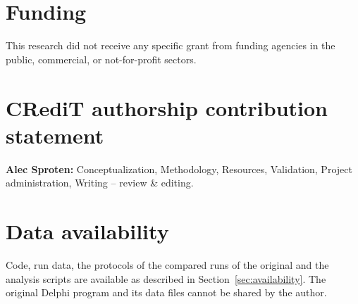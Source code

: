 \documentclass[preprint,12pt,authoryear]{elsarticle}
\begin{document}
\section*{Funding}

This research did not receive any specific grant from funding agencies in the public, commercial, or not-for-profit sectors.

\section*{CRediT authorship contribution statement}

\textbf{Alec Sproten:} Conceptualization, Methodology, Resources, Validation, Project administration, Writing -- review \& editing.

\section*{Data availability}

Code, run data, the protocols of the compared runs of the original and the analysis scripts are available as described in Section~\ref{sec:availability}. The original Delphi program and its data files cannot be shared by the author.



\end{document}
